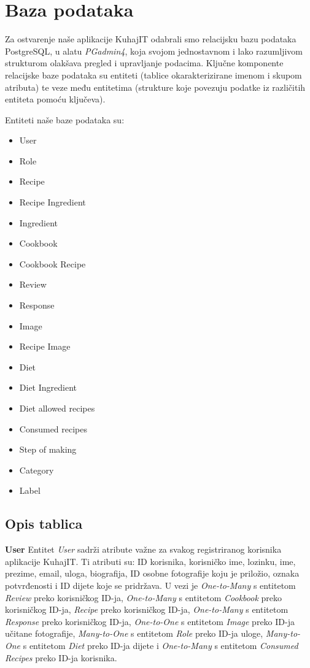 		\section{Baza podataka}

		Za ostvarenje naše aplikacije KuhajIT odabrali smo relacijsku bazu podataka PostgreSQL, u alatu \textit{PGadmin4}, koja svojom jednostavnom i lako razumljivom strukturom olakšava pregled i upravljanje podacima. Ključne komponente relacijske baze podataka su entiteti (tablice okarakterizirane imenom i skupom atributa) te veze među entitetima (strukture koje povezuju podatke iz različitih entiteta pomoću ključeva).
		
		Entiteti naše baze podataka su:
		\begin{itemize}
			\item User
			\item Role
			\item Recipe
			\item Recipe Ingredient
			\item Ingredient
			\item Cookbook
			\item Cookbook Recipe
			\item Review
			\item Response
			\item Image
			\item Recipe Image
			\item Diet
			\item Diet Ingredient
			\item Diet allowed recipes
			\item Consumed recipes
			\item Step of making
			\item Category
			\item Label
		\end{itemize}
		
		
			\subsection{Opis tablica}
				
				\textbf{User} Entitet \textit{User} sadrži atribute važne za svakog registriranog korisnika aplikacije KuhajIT. Ti atributi su: ID korisnika, korisničko ime, lozinku, ime, prezime, email, uloga, biografija, ID osobne fotografije koju je priložio, oznaka potvrđenosti i ID dijete koje se pridržava. U vezi je \textit{One-to-Many} s entitetom \textit{Review} preko korisničkog ID-ja, \textit{One-to-Many} s entitetom \textit{Cookbook} preko korisničkog ID-ja, \textit{Recipe} preko korisničkog ID-ja, \textit{One-to-Many} s entitetom \textit{Response} preko korisničkog ID-ja, \textit{One-to-One} s entitetom \textit{Image} preko ID-ja učitane fotografije, \textit{Many-to-One} s entitetom \textit{Role} preko ID-ja uloge, \textit{Many-to-One} s entitetom \textit{Diet} preko ID-ja dijete i \textit{One-to-Many} s entitetom \textit{Consumed Recipes} preko ID-ja korisnika.
				
